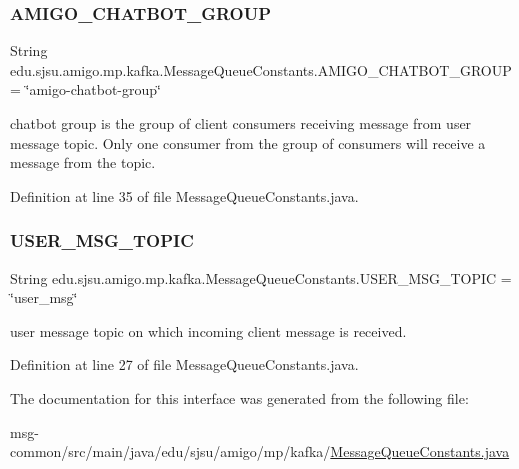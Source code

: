 \subsubsection{\texorpdfstring{A\+M\+I\+G\+O\+\_\+\+C\+H\+A\+T\+B\+O\+T\+\_\+\+G\+R\+O\+UP}{AMIGO\_CHATBOT\_GROUP}}
{\footnotesize\ttfamily String edu.\+sjsu.\+amigo.\+mp.\+kafka.\+Message\+Queue\+Constants.\+A\+M\+I\+G\+O\+\_\+\+C\+H\+A\+T\+B\+O\+T\+\_\+\+G\+R\+O\+UP = \char`\"{}amigo-\/chatbot-\/group\char`\"{}}

chatbot group is the group of client consumers receiving message from user message topic. Only one consumer from the group of consumers will receive a message from the topic. 

Definition at line 35 of file Message\+Queue\+Constants.\+java.

\mbox{\label{interfaceedu_1_1sjsu_1_1amigo_1_1mp_1_1kafka_1_1_message_queue_constants_a2ea671fec4966c5b03694061460019c7}} 
\subsubsection{\texorpdfstring{U\+S\+E\+R\+\_\+\+M\+S\+G\+\_\+\+T\+O\+P\+IC}{USER\_MSG\_TOPIC}}
{\footnotesize\ttfamily String edu.\+sjsu.\+amigo.\+mp.\+kafka.\+Message\+Queue\+Constants.\+U\+S\+E\+R\+\_\+\+M\+S\+G\+\_\+\+T\+O\+P\+IC = \char`\"{}user\+\_\+msg\char`\"{}}

user message topic on which incoming client message is received. 

Definition at line 27 of file Message\+Queue\+Constants.\+java.



The documentation for this interface was generated from the following file\+:\begin{DoxyCompactItemize}
\item 
msg-\/common/src/main/java/edu/sjsu/amigo/mp/kafka/\hyperlink{_message_queue_constants_8java}{Message\+Queue\+Constants.\+java}\end{DoxyCompactItemize}
